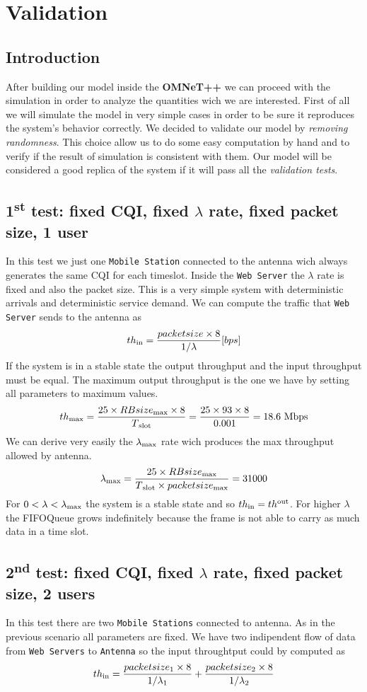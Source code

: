 \chapter{Validation}

\section{Introduction}
After building our model inside the \textbf{OMNeT++} we can proceed with the simulation in order to analyze the quantities wich we are interested. First of all we will simulate the model in very simple cases in order to be sure it reproduces the system's behavior correctly. We decided to validate our model by \textit{removing randomness}. This choice allow us to do some easy computation by hand and to verify if the result of simulation is consistent with them. Our model will be considered a good replica of the system if it will pass all the \textit{validation tests}.

\section{1\textsuperscript{st} test: fixed CQI, fixed \(\lambda\) rate, fixed packet size, 1 user}
In this test we just one \texttt{Mobile Station} connected to the antenna wich always generates the same CQI for each timeslot. Inside the \texttt{Web Server} the \(\lambda\) rate is fixed and also the packet size. This is a very simple system with deterministic arrivals and deterministic service demand. We can compute the traffic that \texttt{Web Server} sends to the antenna as \[ th\textsubscript{in} = \frac{packetsize \times 8}{1/\lambda} \lbrack bps \rbrack \] 
If the system is in a stable state the output throughput and the input throughput must be equal. The maximum output throughput is the one we have by setting all parameters to maximum values. \[ th\textsubscript{max} = \frac{25 \times RBsize\textsubscript{max} \times 8}{T\textsubscript{slot}} = \frac{25 \times 93 \times 8}{0.001} = 18.6 \textnormal{ Mbps} \] We can derive very easily the \(\lambda\textsubscript{max}\) rate wich produces the max throughput allowed by antenna. \[\lambda\textsubscript{max} = \frac{25 \times RBsize\textsubscript{max}}{T\textsubscript{slot} \times packetsize\textsubscript{max}} = 31000 \] For \( 0<\lambda<\lambda\textsubscript{max} \) the system is a stable state and so \(th\textsubscript{in} = th\textsuperscript{out}\). For higher \(\lambda\) the FIFOQueue grows indefinitely because the frame is not able to carry as much data in a time slot.

\section{2\textsuperscript{nd} test: fixed CQI, fixed \(\lambda\) rate, fixed packet size, 2 users}
In this test there are two \texttt{Mobile Stations} connected to antenna. As in the previous scenario all parameters are fixed. We have two indipendent flow of data from \texttt{Web Servers} to \texttt{Antenna} so the input throughtput could by computed as
\[ th\textsubscript{in} = \frac{packetsize\textsubscript{1} \times 8}{1/\lambda\textsubscript{1}} + \frac{packetsize\textsubscript{2} \times 8}{1/\lambda\textsubscript{2}}\]

